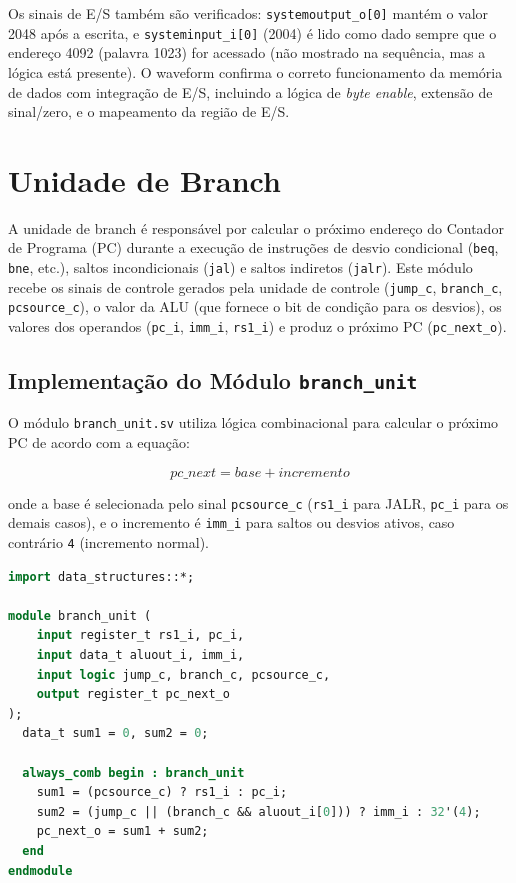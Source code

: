 \documentclass[
	12pt,				%
	oneside,
	a4paper,			%
	english,			%
	french,				%
	spanish,			%
	brazil,				%
	]{abntex2}
\begin{document}
Os sinais de E/S também são verificados: \texttt{systemoutput\_o[0]} mantém o valor 2048 após a escrita, e \texttt{systeminput\_i[0]} (2004) é lido como dado sempre que o endereço 4092 (palavra 1023) for acessado (não mostrado na sequência, mas a lógica está presente). O waveform confirma o correto funcionamento da memória de dados com integração de E/S, incluindo a lógica de \textit{byte enable}, extensão de sinal/zero, e o mapeamento da região de E/S.

\section{Unidade de Branch}

A unidade de branch é responsável por calcular o próximo endereço do Contador de Programa (PC) durante a execução de instruções de desvio condicional (\texttt{beq}, \texttt{bne}, etc.), saltos incondicionais (\texttt{jal}) e saltos indiretos (\texttt{jalr}). Este módulo recebe os sinais de controle gerados pela unidade de controle (\texttt{jump\_c}, \texttt{branch\_c}, \texttt{pcsource\_c}), o valor da ALU (que fornece o bit de condição para os desvios), os valores dos operandos (\texttt{pc\_i}, \texttt{imm\_i}, \texttt{rs1\_i}) e produz o próximo PC (\texttt{pc\_next\_o}).

\subsection{Implementação do Módulo \texttt{branch\_unit}}

O módulo \texttt{branch\_unit.sv} utiliza lógica combinacional para calcular o próximo PC de acordo com a equação:

\[
pc\_next = base + incremento
\]

onde a base é selecionada pelo sinal \texttt{pcsource\_c} (\texttt{rs1\_i} para JALR, \texttt{pc\_i} para os demais casos), e o incremento é \texttt{imm\_i} para saltos ou desvios ativos, caso contrário \texttt{4} (incremento normal).

\begin{lstlisting}[language=SystemVerilog, caption={Módulo branch\_unit.sv}, label={lst:branch_unit}]
import data_structures::*;

module branch_unit (
    input register_t rs1_i, pc_i,
    input data_t aluout_i, imm_i,
    input logic jump_c, branch_c, pcsource_c,
    output register_t pc_next_o
);
  data_t sum1 = 0, sum2 = 0;

  always_comb begin : branch_unit
    sum1 = (pcsource_c) ? rs1_i : pc_i;
    sum2 = (jump_c || (branch_c && aluout_i[0])) ? imm_i : 32'(4);
    pc_next_o = sum1 + sum2;
  end
endmodule
\end{lstlisting}
\end{document}

